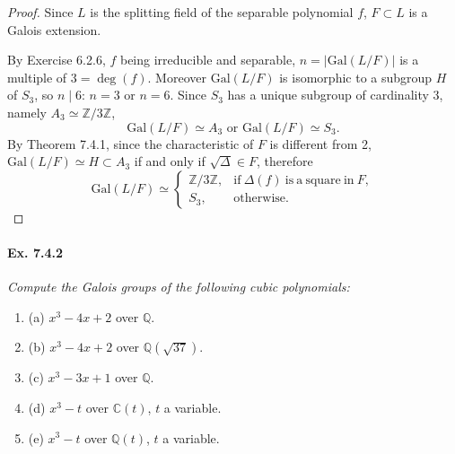 \documentclass[11pt,a4paper]{article}
\newcommand{\be} {\begin{enumerate}}
\newcommand{\ee} {\end{enumerate}}
\newcommand{\Q}{\mathbb{Q}}
\newcommand{\Z}{\mathbb{Z}}
\newcommand{\C}{\mathbb{C}}
\newcommand{\Gal}{\mathrm{Gal}}
\begin{document}
\begin{proof}
Since $L$ is the splitting field of the separable polynomial $f$, $F \subset L$ is a Galois extension.

By Exercise 6.2.6, $f$ being irreducible and separable, $n = \vert \Gal(L/F) \vert $ is a multiple of $3 = \deg(f)$. Moreover $\Gal(L/F)$ is isomorphic to a subgroup $H$ of $S_3$, so $n \mid 6$: $n=3$ or $n=6$. Since $S_3$ has a unique subgroup of cardinality 3, namely $A_3 \simeq \Z/3\Z$,
$$\Gal(L/F) \simeq A_3 \text{ or } \Gal(L/F) \simeq S_3.$$ 
By Theorem 7.4.1, since the characteristic of $F$ is different from 2, $\Gal(L/F) \simeq H \subset A_3$ if and only if $\sqrt{\Delta} \in F$, therefore
$$
\Gal(L/F) \simeq 
\left\{
\begin{array}{ll}
 \Z/3\Z, &   \mathrm{if}\ \Delta(f)\ \mathrm{is}\  \mathrm{a}\  \mathrm{square}\  \mathrm{in} \ F,   \\
  S_3,&        \mathrm{otherwise.}
\end{array}
\right.
$$
\end{proof}

\paragraph{Ex. 7.4.2}

{\it Compute the Galois groups of the following cubic polynomials:
\be
\item[(a)] $x^3-4x+2$ over $\Q$.
\item[(b)] $x^3 - 4x+2$ over $\Q(\sqrt{37})$.
\item[(c)] $x^3-3x+1$ over $\Q$.
\item[(d)] $x^3-t$ over $\C(t)$, $t$ a variable.
\item[(e)] $x^3 - t$ over $\Q(t)$, $t$ a variable.
\ee
}
\end{document}

